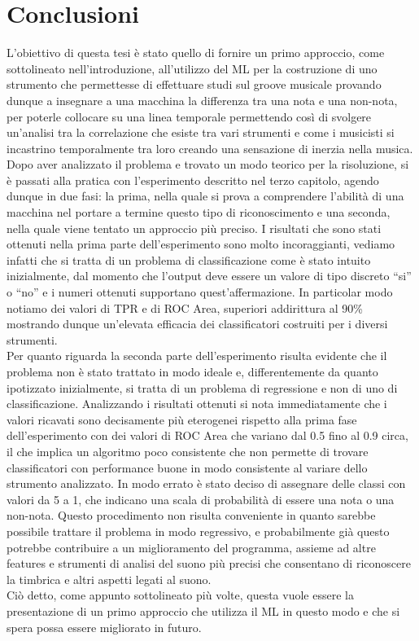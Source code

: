 \chapter*{Conclusioni}
L'obiettivo di questa tesi è stato quello di fornire un primo approccio, come sottolineato nell'introduzione, all'utilizzo del ML per la costruzione di uno strumento che permettesse di effettuare studi sul groove musicale provando dunque a insegnare a una macchina la differenza tra una nota e una non-nota, per poterle collocare su una linea temporale permettendo così di svolgere un'analisi tra la correlazione che esiste tra vari strumenti e come i musicisti si incastrino temporalmente tra loro creando una sensazione di inerzia nella musica. Dopo aver analizzato il problema e trovato un modo teorico per la risoluzione, si è passati alla pratica con l'esperimento descritto nel terzo capitolo, agendo dunque in due fasi: la prima, nella quale si prova a comprendere l'abilità di una macchina nel portare a termine questo tipo di riconoscimento e una seconda, nella quale viene tentato un approccio più preciso. I risultati che sono stati ottenuti nella prima parte dell'esperimento sono molto incoraggianti, vediamo infatti che si tratta di un problema di classificazione come è stato intuito inizialmente, dal momento che l'output deve essere un valore di tipo discreto ``si'' o ``no'' e i numeri ottenuti supportano quest'affermazione. In particolar modo notiamo dei valori di TPR e di ROC Area, superiori addirittura al 90\% mostrando dunque un'elevata efficacia dei classificatori costruiti per i diversi strumenti.\\
Per quanto riguarda la seconda parte dell'esperimento risulta evidente che il problema non è stato trattato in modo ideale e, differentemente da quanto ipotizzato inizialmente, si tratta di un problema di regressione e non di uno di classificazione. Analizzando i risultati ottenuti si nota immediatamente che i valori ricavati sono decisamente più eterogenei rispetto alla prima fase dell'esperimento con dei valori di ROC Area che variano dal 0.5 fino al 0.9 circa, il che implica un algoritmo poco consistente che non permette di trovare classificatori con performance buone in modo consistente al variare dello strumento analizzato. In modo errato è stato deciso di assegnare delle classi con valori da 5 a 1, che indicano una scala di probabilità di essere una nota o una non-nota. Questo procedimento non risulta conveniente in quanto sarebbe possibile trattare il problema in modo regressivo, e probabilmente già questo potrebbe contribuire a un miglioramento del programma, assieme ad altre features e strumenti di analisi del suono più precisi che consentano di riconoscere la timbrica e altri aspetti legati al suono.\\
Ciò detto, come appunto sottolineato più volte, questa vuole essere la presentazione di un primo approccio che utilizza il ML in questo modo e che si spera possa essere migliorato in futuro.

